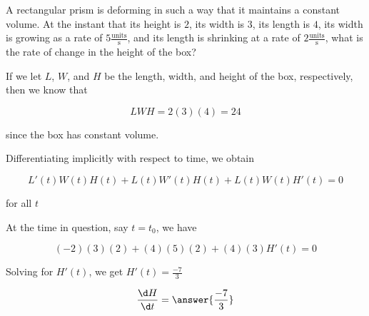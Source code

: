 \documentclass{ximera}
\author{Steven Gubkin}
\begin{document}
\begin{exercise}



A rectangular prism is deforming in such a way that it maintains a constant volume.  At the instant that its height is $2$, its width is $3$, its length is $4$, its width is growing as a rate of $5 \frac{\textrm{units}}{\textrm{s}}$, and its length is shrinking at a rate of $2 \frac{\textrm{units}}{\textrm{s}}$, what is the rate of change in the height of the box?

\begin{hint}
If we let $L$, $W$, and $H$ be the length, width, and height of the box, respectively, then we know that

\[
LWH = 2(3)(4) = 24
\]

since the box has constant volume.
\end{hint}

\begin{hint}	
	Differentiating implicitly with respect to time, we obtain

\[
L'(t)W(t)H(t)+L(t)W'(t)H(t)+L(t)W(t)H'(t) = 0
\]

for all $t$
\end{hint}

\begin{hint}
	At the time in question, say $t = t_0$, we have

\[
(-2)(3)(2)+(4)(5)(2)+(4)(3)H'(t) = 0
\]
\end{hint}

\begin{hint}	
	Solving for $H'(t)$, we get $H'(t) = \frac{-7}{3}$
\end{hint}

\begin{prompt}
	\[\frac{\d H}{\d t} = \answer{\frac{-7}{3}}\]
\end{prompt}

\end{exercise}
\end{document}
